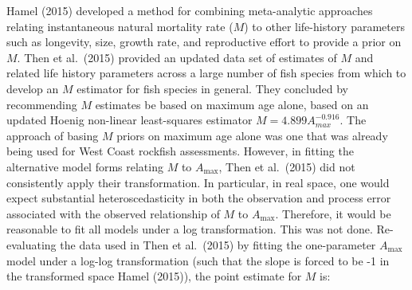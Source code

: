 \documentclass[11pt,
  english,
  a4paper,
]{article}
\begin{document}
Hamel {(2015)\leavevmode\tagmcend\tagstructend} developed a method for combining meta-analytic approaches relating instantaneous natural mortality rate ({\(M\)\leavevmode\tagmcend\tagstructend}) to other life-history parameters such as longevity, size, growth rate, and reproductive effort to provide a prior on {\(M\)\leavevmode\tagmcend\tagstructend}. Then et al.~{(2015)\leavevmode\tagmcend\tagstructend} provided an updated data set of estimates of {\(M\)\leavevmode\tagmcend\tagstructend} and related life history parameters across a large number of fish species from which to develop an {\(M\)\leavevmode\tagmcend\tagstructend} estimator for fish species in general. They concluded by recommending {\(M\)\leavevmode\tagmcend\tagstructend} estimates be based on maximum age alone, based on an updated Hoenig non-linear least-squares estimator {\(M=4.899A^{-0.916}_{max}\)\leavevmode\tagmcend\tagstructend}. The approach of basing {\(M\)\leavevmode\tagmcend\tagstructend} priors on maximum age alone was one that was already being used for West Coast rockfish assessments. However, in fitting the alternative model forms relating {\(M\)\leavevmode\tagmcend\tagstructend} to {\(A_{\text{max}}\)\leavevmode\tagmcend\tagstructend}, Then et al.~{(2015)\leavevmode\tagmcend\tagstructend} did not consistently apply their transformation. In particular, in real space, one would expect substantial heteroscedasticity in both the observation and process error associated with the observed relationship of {\(M\)\leavevmode\tagmcend\tagstructend} to {\(A_{\text{max}}\)\leavevmode\tagmcend\tagstructend}. Therefore, it would be reasonable to fit all models under a log transformation. This was not done. Re-evaluating the data used in Then et al.~{(2015)\leavevmode\tagmcend\tagstructend} by fitting the one-parameter {\(A_{\text{max}}\)\leavevmode\tagmcend\tagstructend} model under a log-log transformation (such that the slope is forced to be -1 in the transformed space Hamel {(2015)\leavevmode\tagmcend\tagstructend}), the point estimate for {\(M\)\leavevmode\tagmcend\tagstructend} is:
\end{document}
